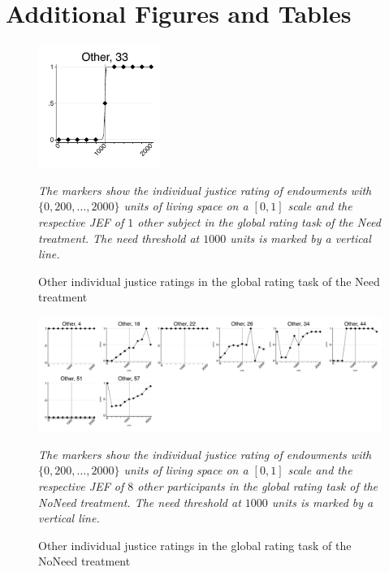 \documentclass[12pt]{scrartcl}
\begin{document}
\newpage
\appendix


\section{Additional Figures and Tables}\label{sec:app_additional}
\begin{figure}[hb]
   \centering
   \includegraphics[width=4cm]{figures/figure_11.pdf}
   \begin{minipage}{\linewidth}
      \footnotesize
      \textit{The markers show the individual justice rating of endowments with $\{0,200,\ldots,2000\}$ units of living space on a $[0,1]$ scale and the respective JEF of $1$ other subject in the global rating task of the Need treatment. The need threshold at $1000$ units is marked by a vertical line.}
   \end{minipage}
   \caption{Other individual justice ratings in the global rating task of the Need treatment}\label{fig:figure_11}
\end{figure}

\begin{figure}[hb]
   \centering
   \includegraphics[width=\linewidth]{figures/figure_12.pdf}
   \begin{minipage}{\linewidth}
      \footnotesize
      \textit{The markers show the individual justice rating of endowments with $\{0,200,\ldots,2000\}$ units of living space on a $[0,1]$ scale and the respective JEF of $8$ other participants in the global rating task of the NoNeed treatment. The need threshold at $1000$ units is marked by a vertical line.}
   \end{minipage}
   \caption{Other individual justice ratings in the global rating task of the NoNeed treatment}\label{fig:figure_12}
\end{figure}
\end{document}
